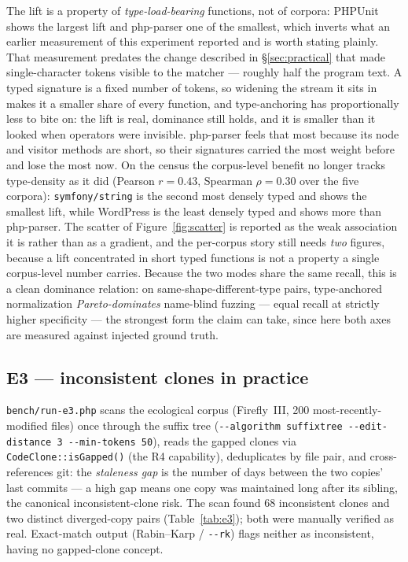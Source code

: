 \documentclass[10pt,a4paper]{article}
\newcounter{prop}[section]
\begin{document}
The lift is a property of \emph{type-load-bearing} functions, not of corpora: PHPUnit shows the
largest lift and php-parser one of the smallest, which inverts what an earlier measurement of this
experiment reported and is worth stating plainly. That measurement predates the change described in
\S\ref{sec:practical} that made single-character tokens visible to the matcher --- roughly half the
program text. A typed signature is a fixed number of tokens, so widening the stream it sits in makes
it a smaller share of every function, and type-anchoring has proportionally less to bite on: the lift
is real, dominance still holds, and it is smaller than it looked when operators were invisible.
php-parser feels that most because its node and visitor methods are short, so their signatures
carried the most weight before and lose the most now.
On the census the corpus-level
benefit no longer tracks type-density as it did (Pearson $r=0.43$, Spearman $\rho=0.30$ over the five
corpora): \texttt{symfony/string} is the second most densely typed and shows the smallest lift, while
WordPress is the least densely typed and shows more than php-parser. The scatter of
Figure~\ref{fig:scatter} is reported as the weak association it is rather than as a gradient, and the
per-corpus story still needs \emph{two} figures, because a lift concentrated in short typed functions
is not a property a single corpus-level number carries. Because the two modes share the same recall, this is a clean
dominance relation: on same-shape-different-type pairs, type-anchored normalization
\emph{Pareto-dominates} name-blind fuzzing --- equal recall at strictly higher specificity --- the
strongest form the claim can take, since here both axes are measured against injected ground truth.

\subsection{E3 --- inconsistent clones in practice}
\texttt{bench/run-e3.php} scans the ecological corpus (Firefly~III, 200 most-recently-modified files)
once through the suffix tree (\texttt{-{}-algorithm suffixtree -{}-edit-distance 3 -{}-min-tokens 50}), reads
the gapped clones via \lstinline!CodeClone::isGapped()! (the R4 capability), deduplicates by file
pair, and cross-references git: the \emph{staleness gap} is the number of days between the two copies'
last commits --- a high gap means one copy was maintained long after its sibling, the canonical
inconsistent-clone risk. The scan found 68 inconsistent clones and two distinct diverged-copy pairs
(Table~\ref{tab:e3}); both were manually verified as real. Exact-match output (Rabin--Karp /
\texttt{-{}-rk}) flags neither as inconsistent, having no gapped-clone concept.
\end{document}

